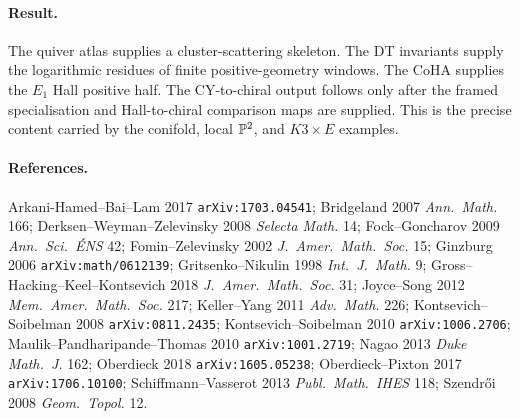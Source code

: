 \paragraph{Result.}
The quiver atlas supplies a cluster-scattering skeleton. The DT
invariants supply the logarithmic residues of finite positive-geometry
windows. The CoHA supplies the $E_{1}$ Hall positive half. The
CY-to-chiral output follows only after the framed specialisation and
Hall-to-chiral comparison maps are supplied. This is the precise
content carried by the conifold, local $\mathbb{P}^2$, and $K3\times E$
examples.

\paragraph{References.}
Arkani-Hamed--Bai--Lam 2017 \texttt{arXiv:1703.04541};
Bridgeland 2007 \emph{Ann.\ Math.} 166;
Derksen--Weyman--Zelevinsky 2008 \emph{Selecta Math.} 14;
Fock--Goncharov 2009 \emph{Ann.\ Sci.\ \'ENS} 42;
Fomin--Zelevinsky 2002 \emph{J.\ Amer.\ Math.\ Soc.} 15;
Ginzburg 2006 \texttt{arXiv:math/0612139};
Gritsenko--Nikulin 1998 \emph{Int.\ J.\ Math.} 9;
Gross--Hacking--Keel--Kontsevich 2018
\emph{J.\ Amer.\ Math.\ Soc.} 31;
Joyce--Song 2012 \emph{Mem.\ Amer.\ Math.\ Soc.} 217;
Keller--Yang 2011 \emph{Adv.\ Math.} 226;
Kontsevich--Soibelman 2008 \texttt{arXiv:0811.2435};
Kontsevich--Soibelman 2010 \texttt{arXiv:1006.2706};
Maulik--Pandharipande--Thomas 2010 \texttt{arXiv:1001.2719};
Nagao 2013 \emph{Duke Math.\ J.} 162;
Oberdieck 2018 \texttt{arXiv:1605.05238};
Oberdieck--Pixton 2017 \texttt{arXiv:1706.10100};
Schiffmann--Vasserot 2013 \emph{Publ.\ Math.\ IHES} 118;
Szendr\H{o}i 2008 \emph{Geom.\ Topol.} 12.
